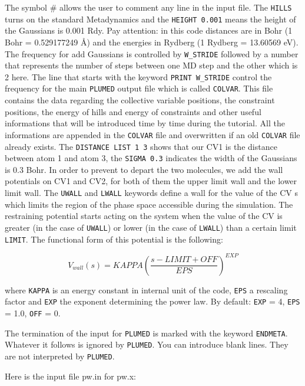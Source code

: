 \documentclass[12pt,a4paper]{article}
\begin{document}
The symbol \# allows the user to comment any line in the input file. The \texttt{HILLS} turns on the standard Metadynamics and the \texttt{HEIGHT 0.001} means the height of the Gaussians is 0.001 Rdy. Pay attention: in this code distances are in Bohr (1 Bohr = 0.529177249 \AA) and the energies in Rydberg (1 Rydberg  = 13.60569 eV). The frequency for add Gaussians is controlled by \texttt{W\_STRIDE} followed by a number that represents the number of steps between one MD step and the other which is 2 here. The line that starts with the keyword \texttt{PRINT W\_STRIDE} control the frequency for the main \texttt{PLUMED} output file which is called \texttt{COLVAR}. This file contains the data regarding the collective variable positions, the constraint positions, the energy of hills and energy of constraints and other useful informations that will be introduced time by time during the tutorial. All the informations are appended in the \texttt{COLVAR} file and overwritten if an old \texttt{COLVAR} file already exists. The \texttt{DISTANCE LIST 1 3} shows that our CV1 is the distance between atom 1 and atom 3, the \texttt{SIGMA 0.3} indicates the width of the Gaussians is 0.3 Bohr. In order to prevent to depart the two molecules, we add the wall potentials on CV1 and CV2, for both of them the upper limit wall and the lower limit wall. The \texttt{UWALL} and \texttt{LWALL} keywords define a wall for the value of the CV s which limits the region of the phase space accessible during the simulation. The restraining potential starts acting on the system when the value of the CV is greater (in the case of \texttt{UWALL}) or lower (in the case of \texttt{LWALL}) than a certain limit \texttt{LIMIT}. The functional form of this potential is the following:

\begin{equation}
V_{wall}(s) = KAPPA (\frac{s - LIMIT + OFF}{EPS})^{EXP}
\label{EQ_vwall}
\end{equation}

where \texttt{KAPPA} is an energy constant in internal unit of the code, \texttt{EPS} a rescaling factor and \texttt{EXP} the exponent determining the power law. By default: \texttt{EXP} = 4, \texttt{EPS} = 1.0, \texttt{OFF} = 0.

The termination of the input for \texttt{PLUMED} is marked with the keyword \texttt{ENDMETA}. Whatever it follows is ignored by \texttt{PLUMED}. You can introduce blank lines. They are not interpreted by \texttt{PLUMED}.

Here is the input file pw.in for pw.x:
\end{document}
